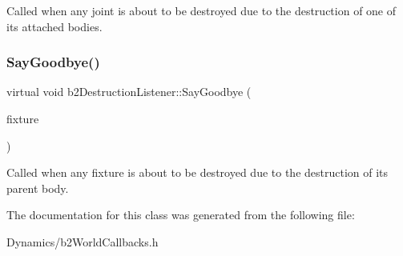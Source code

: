 Called when any joint is about to be destroyed due to the destruction of one of its attached bodies. \mbox{\label{classb2DestructionListener_ab327c0073d162112c38d2fe8f8b9fce3}} 
\subsubsection{\texorpdfstring{Say\+Goodbye()}{SayGoodbye()}\hspace{0.1cm}{\footnotesize\ttfamily [2/2]}}
{\footnotesize\ttfamily virtual void b2\+Destruction\+Listener\+::\+Say\+Goodbye (\begin{DoxyParamCaption}\item[{\mbox{\hyperlink{classb2Fixture}{b2\+Fixture}} $\ast$}]{fixture }\end{DoxyParamCaption})\hspace{0.3cm}{\ttfamily [pure virtual]}}

Called when any fixture is about to be destroyed due to the destruction of its parent body. 

The documentation for this class was generated from the following file\+:\begin{DoxyCompactItemize}
\item 
Dynamics/b2\+World\+Callbacks.\+h\end{DoxyCompactItemize}
